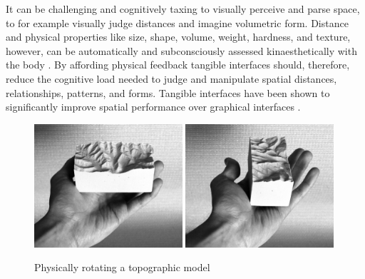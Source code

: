 \documentclass[prodmode,acmtochi]{acmsmall} %
\begin{document}
It can be challenging and cognitively taxing to visually perceive and parse space, to for example visually judge distances and imagine volumetric form.
%
Distance and physical properties like size, shape, volume, weight, hardness, and texture, however, can be automatically and subconsciously assessed kinaesthetically with the body \cite{Jeannerod1997}. 
%
By affording physical feedback tangible interfaces should, therefore, reduce the cognitive load needed to judge and manipulate spatial distances, relationships, patterns, and forms. 
%
Tangible interfaces have been shown to significantly improve spatial performance 
over graphical interfaces \cite{Cuendet2012}.

\begin{figure}[h!]
\begin{center}
		\includegraphics[width=0.49\textwidth]{images/physical_rotation_1.jpg}
		\includegraphics[width=0.49\textwidth]{images/physical_rotation_2.jpg}
	\caption{Physically rotating a topographic model}
	\label{fig:physical_rotation}
\end{center}
\end{figure}
\end{document}
